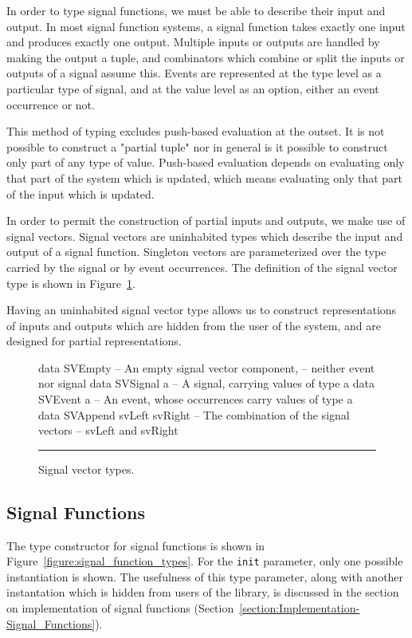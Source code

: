 In order to type signal functions, we must be able to describe their input and
output. In most signal function systems, a signal function takes exactly one
input and produces exactly one output. Multiple inputs or outputs are handled
by making the output a tuple, and combinators which combine or split the inputs
or outputs of a signal assume this. Events are represented at the type level
as a particular type of signal, and at the value level as an option, either an
event occurrence or not.

This method of typing excludes push-based evaluation at the outset.
It is not possible to construct a "partial tuple" nor in general is it possible
to construct only part of any type of value. Push-based evaluation depends on
evaluating only that part of the system which is updated, which means evaluating
only that part of the input which is updated.

In order to permit the construction of partial inputs and outputs, we make use
of signal vectors. Signal vectors are uninhabited types which describe the input
and output of a signal function. Singleton vectors are parameterized over the
type carried by the signal or by event occurrences. The definition of the signal
vector type is shown in Figure~\ref{figure:signal_vector_types}. 

Having an uninhabited signal vector type allows us to construct representations
of inputs and outputs which are hidden from the user of the system, and are
designed for partial representations.

\begin{figure}
\begin{code}
data SVEmpty    -- An empty signal vector component,
                -- neither event nor signal
data SVSignal a -- A signal, carrying values of type a
data SVEvent a  -- An event, whose occurrences carry values of type a
data SVAppend svLeft svRight -- The combination of the signal vectors
                             -- svLeft and svRight
\end{code}
\hrule
\caption{Signal vector types.}
\label{figure:signal_vector_types}
\end{figure}

\subsection{Signal Functions}
\label{subsection:System_Design_and_Interface-Types-Signal_Functions}

The type constructor for signal functions is shown in
Figure~\ref{figure:signal_function_types}. For the {\tt init} parameter, only
one possible instantiation is shown. The usefulness of this type parameter,
along with another instantation which is hidden from users of the library,
is discussed in the section on implementation of signal functions
(Section~\ref{section:Implementation-Signal_Functions}).

